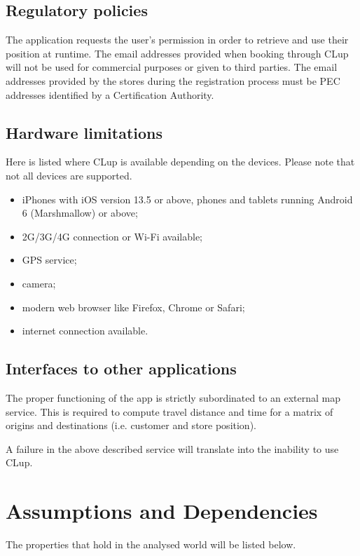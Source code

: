 \subsection{Regulatory policies}
The application requests the user's permission in order to retrieve and use their position at runtime.\newline
The email addresses provided when booking through CLup will not be used for commercial purposes or given to third parties.\newline
The email addresses provided by the stores during the registration process must be PEC addresses identified by a Certification Authority.

\subsection{Hardware limitations}
Here is listed where CLup is available depending on the devices. Please note that not all devices are supported.

\begin{itemize}
	\item iPhones with iOS version 13.5 or above, phones and tablets running Android 6 (Marshmallow) or above;
	\item 2G/3G/4G connection or Wi-Fi available;
	\item GPS service;
	\item camera;
	\item modern web browser like Firefox, Chrome or Safari;
	\item internet connection available.
\end{itemize}


\subsection{Interfaces to other applications}
The proper functioning of the app is strictly subordinated to an external map service. This is required to compute travel distance and time for a matrix of origins and destinations (i.e. customer and store position).

A failure in the above described service will translate into the inability to use CLup.

\clearpage

\section{Assumptions and Dependencies}
The properties that hold in the analysed world will be listed below.
